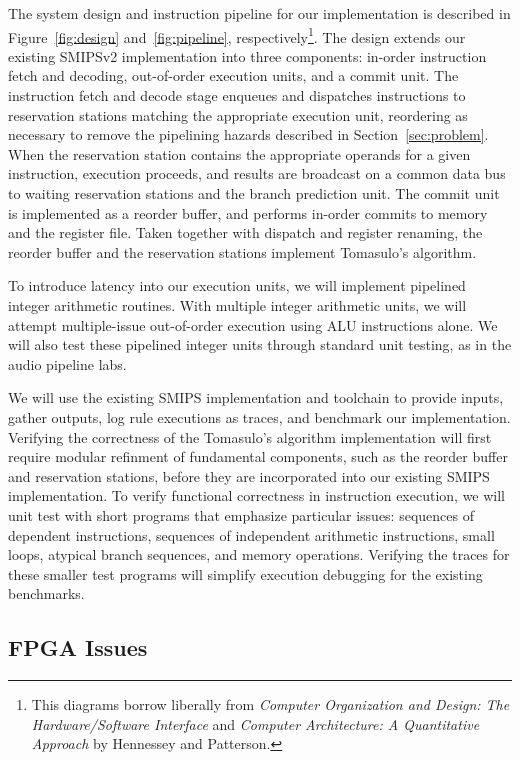 \documentclass[12pt]{article}
\begin{document}
The system design and instruction pipeline for our implementation is described
in Figure~\ref{fig:design} and~\ref{fig:pipeline}, respectively\footnote{This
diagrams borrow liberally from \emph{Computer Organization and Design: The 
Hardware/Software Interface} and \emph{Computer Architecture: A Quantitative 
Approach} by Hennessey and Patterson.}. The design extends our existing SMIPSv2 
implementation into three components: in-order instruction fetch and decoding, 
out-of-order execution units, and a commit unit. The instruction fetch and 
decode stage enqueues and dispatches instructions to reservation stations 
matching the appropriate execution unit, reordering as necessary to remove the 
pipelining hazards described in Section~\ref{sec:problem}. When the reservation 
station contains the appropriate operands for a given instruction, execution 
proceeds, and results are broadcast on a common data bus to waiting reservation 
stations and the branch prediction unit. The commit unit is implemented as a 
reorder buffer, and performs in-order commits to memory and the register file. 
Taken together with dispatch and register renaming, the reorder buffer and the 
reservation stations implement Tomasulo's algorithm.   

To introduce latency into our execution units, we will implement pipelined
integer arithmetic routines. With multiple integer arithmetic units, we will attempt
multiple-issue out-of-order execution using ALU instructions alone. We will also test
these pipelined integer units through standard unit testing, as in the audio pipeline
labs. 

We will use the existing SMIPS implementation and toolchain to provide inputs, gather 
outputs, log rule executions as traces, and benchmark our implementation. Verifying the 
correctness of the Tomasulo's algorithm implementation will first require modular refinment
of fundamental components, such as the reorder buffer and reservation stations, before 
they are incorporated into our existing SMIPS implementation. To verify functional 
correctness in instruction execution, we will unit test with short programs that 
emphasize particular issues: sequences of dependent instructions, sequences of independent
arithmetic instructions, small loops, atypical branch sequences, and memory operations. 
Verifying the traces for these smaller test programs will simplify execution debugging 
for the existing benchmarks. 


\subsection{FPGA Issues}
\end{document}
